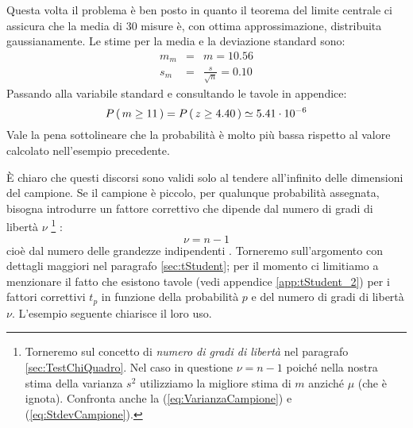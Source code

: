 \begin{exemplify}
{Questa volta il problema \`e ben posto in quanto il teorema del limite
centrale ci assicura che la media di 30 misure \`e, con ottima approssimazione,
distribuita gaussianamente.
Le stime per la media e la deviazione standard sono:
\begin{eqnarray*}
m_m &=& m = 10.56\\
s_m &=& \frac{s}{\sqrt{n}} = 0.10
\end{eqnarray*}
Passando alla variabile standard e consultando le tavole in appendice:
$$
\displaystyle P\left(\, m \geq 11 \, \right) = \displaystyle P\left(\, z \geq 4.40 \, \right) \simeq 5.41 \cdot 10^{-6}
$$
Vale la pena sottolineare che la probabilit\`a \`e molto pi\`u bassa rispetto
al valore calcolato nell'esempio precedente.}

\end{exemplify}

\`E chiaro che questi discorsi sono validi solo al tendere all'infinito delle
dimensioni del campione. Se il campione \`e piccolo, per qualunque
probabilit\`a assegnata, bisogna introdurre un fattore correttivo che dipende
dal numero di gradi di libert\`a $\nu$%
\renewcommand{\thefootnote}{\fnsymbol{footnote}}
\footnote[8]{
Torneremo sul concetto di {\itshape numero di gradi di libert\`a} nel paragrafo
\ref{sec:TestChiQuadro}. Nel caso in questione $\nu = n-1$ poich\'e nella
nostra stima della varianza $s^2$ utilizziamo la migliore stima di $m$
anzich\'e $\mu$ (che \`e ignota).
Confronta anche la (\ref{eq:VarianzaCampione}) e (\ref{eq:StdevCampione}).
}%
\renewcommand{\thefootnote}{\arabic{footnote}}
:
$$
\nu = n-1
$$
cio\`e dal numero delle grandezze indipendenti \cite{Cramer, Arley}.
Torneremo sull'argomento con dettagli maggiori nel paragrafo
\ref{sec:tStudent}; per il momento ci limitiamo a menzionare il fatto che
esistono tavole (vedi appendice \ref{app:tStudent_2}) per i fattori
correttivi $t_p$ in funzione della probabilit\`a $p$ e del numero di
gradi di libert\`a $\nu$. L'esempio seguente chiarisce il loro uso.

\begin{exemplify}


\end{exemplify}


